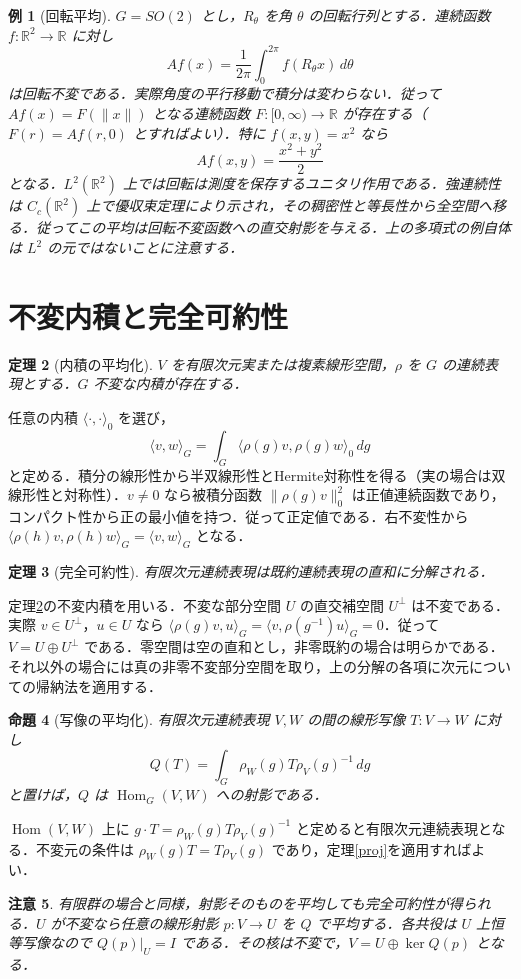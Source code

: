 \documentclass[a5paper,10pt,onecolumn]{jsarticle}
\makeatletter
\theoremstyle{mathnotetheorem}
\newtheorem{theorem}{定理}[section]
\newtheorem{proposition}[theorem]{命題}
\newtheorem{example}[theorem]{例}
\newtheorem{remark}[theorem]{注意}
\renewcommand{\proofname}{証明}
\renewenvironment{proof}[1][\proofname]{%
  \par\pushQED{\qed}\normalfont\topsep4\p@\@plus2\p@\relax
  \trivlist\item[\hskip\labelsep\bfseries #1]\ignorespaces
}{\popQED\endtrivlist\@endpefalse}
\newcommand{\R}{\mathbb{R}}
\newcommand{\norm}[1]{\lVert #1\rVert}
\newcommand{\ip}[2]{\langle #1,#2\rangle}
\makeatother
\begin{document}
\begin{example}[回転平均]
$G=SO(2)$ とし，$R_\theta$ を角 $\theta$ の回転行列とする．連続函数 $f:\R^2\to\R$ に対し
\[
 Af(x)=\frac1{2\pi}\int_0^{2\pi}f(R_\theta x)\,d\theta
\]
は回転不変である．実際角度の平行移動で積分は変わらない．従って $Af(x)=F(\norm x)$ となる連続函数 $F:[0,\infty)\to\R$ が存在する（$F(r)=Af(r,0)$ とすればよい）．特に $f(x,y)=x^2$ なら
\[
 Af(x,y)=\frac{x^2+y^2}{2}
\]
となる．$L^2(\R^2)$ 上では回転は測度を保存するユニタリ作用である．強連続性は $C_c(\R^2)$ 上で優収束定理により示され，その稠密性と等長性から全空間へ移る．従ってこの平均は回転不変函数への直交射影を与える．上の多項式の例自体は $L^2$ の元ではないことに注意する．
\end{example}

\section{不変内積と完全可約性}
\begin{theorem}[内積の平均化]\label{metric}
$V$ を有限次元実または複素線形空間，$\rho$ を $G$ の連続表現とする．$G$ 不変な内積が存在する．
\end{theorem}
\begin{proof}
任意の内積 $\ip{\cdot}{\cdot}_0$ を選び，
\[
 \ip{v}{w}_G=\int_G\ip{\rho(g)v}{\rho(g)w}_0\,dg
\]
と定める．積分の線形性から半双線形性とHermite対称性を得る（実の場合は双線形性と対称性）．$v\ne0$ なら被積分函数 $\norm{\rho(g)v}_0^2$ は正値連続函数であり，コンパクト性から正の最小値を持つ．従って正定値である．右不変性から $\ip{\rho(h)v}{\rho(h)w}_G=\ip{v}{w}_G$ となる．
\end{proof}
\begin{theorem}[完全可約性]\label{reducible}
有限次元連続表現は既約連続表現の直和に分解される．
\end{theorem}
\begin{proof}
定理\ref{metric}の不変内積を用いる．不変な部分空間 $U$ の直交補空間 $U^\perp$ は不変である．実際 $v\in U^\perp$，$u\in U$ なら $\ip{\rho(g)v}{u}_G=\ip{v}{\rho(g^{-1})u}_G=0$．従って $V=U\oplus U^\perp$ である．零空間は空の直和とし，非零既約の場合は明らかである．それ以外の場合には真の非零不変部分空間を取り，上の分解の各項に次元についての帰納法を適用する．
\end{proof}
\begin{proposition}[写像の平均化]\label{intertwine}
有限次元連続表現 $V,W$ の間の線形写像 $T:V\to W$ に対し
\[
 Q(T)=\int_G\rho_W(g)T\rho_V(g)^{-1}\,dg
\]
と置けば，$Q$ は $\operatorname{Hom}_G(V,W)$ への射影である．
\end{proposition}
\begin{proof}
$\operatorname{Hom}(V,W)$ 上に $g\cdot T=\rho_W(g)T\rho_V(g)^{-1}$ と定めると有限次元連続表現となる．不変元の条件は $\rho_W(g)T=T\rho_V(g)$ であり，定理\ref{proj}を適用すればよい．
\end{proof}
\begin{remark}
有限群の場合と同様，射影そのものを平均しても完全可約性が得られる．$U$ が不変なら任意の線形射影 $p:V\to U$ を $Q$ で平均する．各共役は $U$ 上恒等写像なので $Q(p)|_U=I$ である．その核は不変で，$V=U\oplus\ker Q(p)$ となる．
\end{remark}
\end{document}

